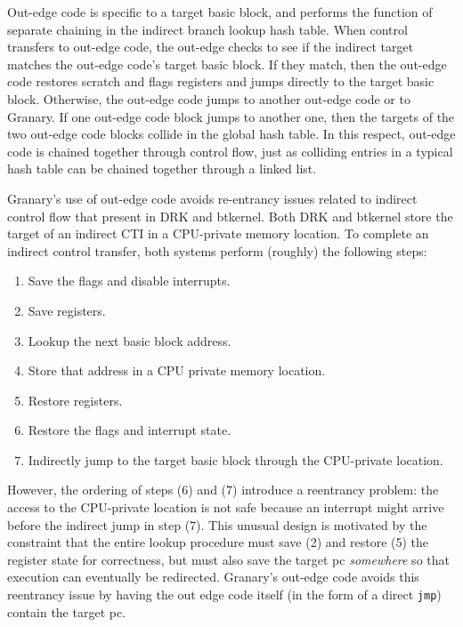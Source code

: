 \documentclass[preprint]{sigplanconf}
\begin{document}
Out-edge code is specific to a target basic block, and performs the function of separate chaining in the indirect branch lookup hash table. When control transfers to out-edge code, the out-edge checks to see if the indirect target matches the out-edge code's target basic block. If they match, then the out-edge code restores scratch and flags registers and jumps directly to the target basic block. Otherwise, the out-edge code jumps to another out-edge code or to Granary. If one out-edge code block jumps to another one, then the targets of the two out-edge code blocks collide in the global hash table. In this respect, out-edge code is chained together through control flow, just as colliding entries in a typical hash table can be chained together through a linked list.

Granary's use of out-edge code avoids re-entrancy issues related to indirect control flow that present in DRK and btkernel. Both DRK and btkernel store the target of an indirect CTI in a CPU-private memory location. To complete an indirect control transfer, both systems perform (roughly) the following steps: \begin{enumerate}[itemindent=\parindent]%
\setlength{\itemsep}{2pt}%
\setlength{\parskip}{0pt}%
	\item Save the flags and disable interrupts.
	\item Save registers.
	\item Lookup the next basic block address.
	\item Store that address in a CPU private memory location.
	\item Restore registers.
	\item Restore the flags and interrupt state.
	\item Indirectly jump to the target basic block through the CPU-private location.
\end{enumerate} %
However, the ordering of steps (6) and (7) introduce a reentrancy problem: the access to the CPU-private location is not safe because an interrupt might arrive before the indirect jump in step (7). This unusual design is motivated by the constraint that the entire lookup procedure must save (2) and restore (5) the register state for correctness, but must also save the target pc \emph{somewhere} so that execution can eventually be redirected. Granary's out-edge code avoids this reentrancy issue by having the out edge code itself (in the form of a direct \texttt{jmp}) contain the target pc.

\end{document}
